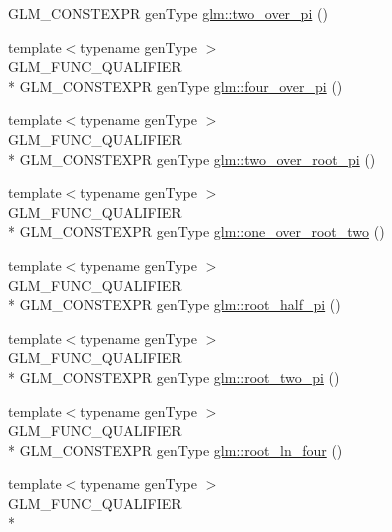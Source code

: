 \begin{DoxyCompactItemize}
G\-L\-M\-\_\-\-C\-O\-N\-S\-T\-E\-X\-P\-R gen\-Type \hyperlink{group__gtc__constants_ga74eadc8a211253079683219a3ea0462a}{glm\-::two\-\_\-over\-\_\-pi} ()
\item 
{\footnotesize template$<$typename gen\-Type $>$ }\\G\-L\-M\-\_\-\-F\-U\-N\-C\-\_\-\-Q\-U\-A\-L\-I\-F\-I\-E\-R \\*
G\-L\-M\-\_\-\-C\-O\-N\-S\-T\-E\-X\-P\-R gen\-Type \hyperlink{group__gtc__constants_ga753950e5140e4ea6a88e4a18ba61dc09}{glm\-::four\-\_\-over\-\_\-pi} ()
\item 
{\footnotesize template$<$typename gen\-Type $>$ }\\G\-L\-M\-\_\-\-F\-U\-N\-C\-\_\-\-Q\-U\-A\-L\-I\-F\-I\-E\-R \\*
G\-L\-M\-\_\-\-C\-O\-N\-S\-T\-E\-X\-P\-R gen\-Type \hyperlink{group__gtc__constants_ga5827301817640843cf02026a8d493894}{glm\-::two\-\_\-over\-\_\-root\-\_\-pi} ()
\item 
{\footnotesize template$<$typename gen\-Type $>$ }\\G\-L\-M\-\_\-\-F\-U\-N\-C\-\_\-\-Q\-U\-A\-L\-I\-F\-I\-E\-R \\*
G\-L\-M\-\_\-\-C\-O\-N\-S\-T\-E\-X\-P\-R gen\-Type \hyperlink{group__gtc__constants_ga788fa23a0939bac4d1d0205fb4f35818}{glm\-::one\-\_\-over\-\_\-root\-\_\-two} ()
\item 
{\footnotesize template$<$typename gen\-Type $>$ }\\G\-L\-M\-\_\-\-F\-U\-N\-C\-\_\-\-Q\-U\-A\-L\-I\-F\-I\-E\-R \\*
G\-L\-M\-\_\-\-C\-O\-N\-S\-T\-E\-X\-P\-R gen\-Type \hyperlink{group__gtc__constants_ga4e276cb823cc5e612d4f89ed99c75039}{glm\-::root\-\_\-half\-\_\-pi} ()
\item 
{\footnotesize template$<$typename gen\-Type $>$ }\\G\-L\-M\-\_\-\-F\-U\-N\-C\-\_\-\-Q\-U\-A\-L\-I\-F\-I\-E\-R \\*
G\-L\-M\-\_\-\-C\-O\-N\-S\-T\-E\-X\-P\-R gen\-Type \hyperlink{group__gtc__constants_ga2bcedc575039fe0cd765742f8bbb0bd3}{glm\-::root\-\_\-two\-\_\-pi} ()
\item 
{\footnotesize template$<$typename gen\-Type $>$ }\\G\-L\-M\-\_\-\-F\-U\-N\-C\-\_\-\-Q\-U\-A\-L\-I\-F\-I\-E\-R \\*
G\-L\-M\-\_\-\-C\-O\-N\-S\-T\-E\-X\-P\-R gen\-Type \hyperlink{group__gtc__constants_ga4129412e96b33707a77c1a07652e23e2}{glm\-::root\-\_\-ln\-\_\-four} ()
\item 
{\footnotesize template$<$typename gen\-Type $>$ }\\G\-L\-M\-\_\-\-F\-U\-N\-C\-\_\-\-Q\-U\-A\-L\-I\-F\-I\-E\-R \\*

\end{DoxyCompactItemize}
